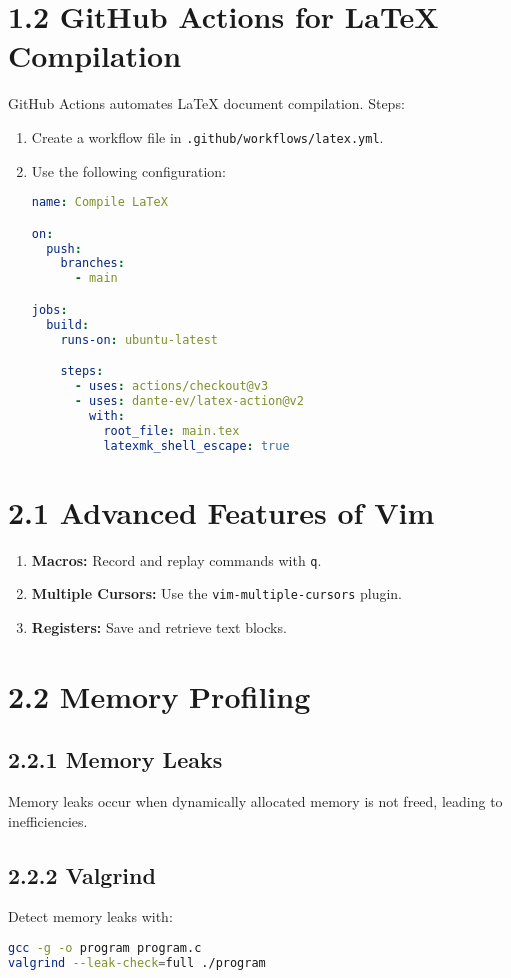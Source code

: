\documentclass[12pt]{article}
\begin{document}
\section*{1.2 GitHub Actions for LaTeX Compilation}
GitHub Actions automates LaTeX document compilation. Steps:
\begin{enumerate}
    \item Create a workflow file in \texttt{.github/workflows/latex.yml}.
    \item Use the following configuration:
    \begin{lstlisting}[language=yaml]
name: Compile LaTeX

on:
  push:
    branches:
      - main

jobs:
  build:
    runs-on: ubuntu-latest

    steps:
      - uses: actions/checkout@v3
      - uses: dante-ev/latex-action@v2
        with:
          root_file: main.tex
          latexmk_shell_escape: true
    \end{lstlisting}
\end{enumerate}

\section*{2.1 Advanced Features of Vim}
\begin{enumerate}
    \item \textbf{Macros:} Record and replay commands with \texttt{q}.
    \item \textbf{Multiple Cursors:} Use the \texttt{vim-multiple-cursors} plugin.
    \item \textbf{Registers:} Save and retrieve text blocks.
\end{enumerate}

\section*{2.2 Memory Profiling}
\subsection*{2.2.1 Memory Leaks}
Memory leaks occur when dynamically allocated memory is not freed, leading to inefficiencies.

\subsection*{2.2.2 Valgrind}
Detect memory leaks with:
\begin{lstlisting}[language=bash]
gcc -g -o program program.c
valgrind --leak-check=full ./program
\end{lstlisting}
\end{document}
